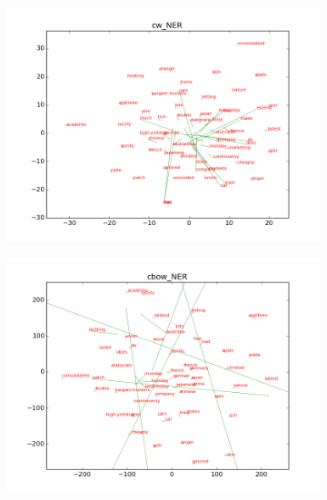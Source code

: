 \begin{figure}[h]
\caption{updated vs. no-updated word representations for NER}
\centering
\begin{subfigure}{6cm}
	\centering
    \includegraphics[scale=0.3]{plots/vectorField/cw_NER.png}    	
	\label{fig:bestpos}
	\subcaption{}	
\end{subfigure}
\begin{subfigure}{6cm}
	\centering
    \includegraphics[scale=0.3]{plots/vectorField/cbow_NER.png}
	\label{fig:bestchunking}
	\subcaption{}	
\end{subfigure}
\begin{subfigure}{6cm}
	\centering

\end{subfigure}
\end{figure}
